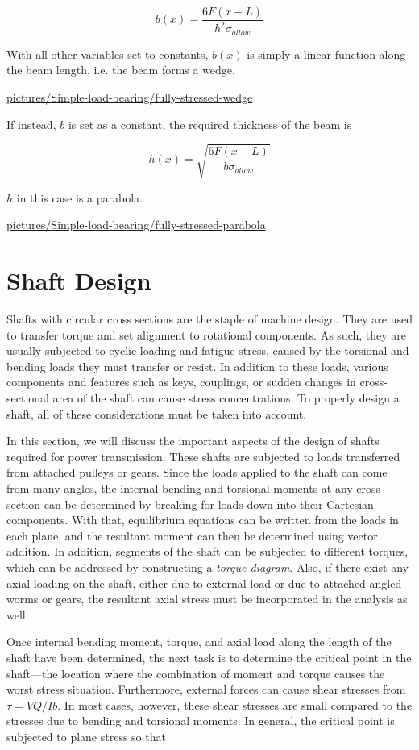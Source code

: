 \documentclass[a4paper,openany,12pt]{book}
\begin{document}
{{$$b(x) = \dfrac{6F(x-L)}{h^2 \sigma_{allow}}$$

With all other variables set to constants, \(b(x)\) is simply a linear
function along the beam length, i.e. the beam forms a wedge.


\url{pictures/Simple-load-bearing/fully-stressed-wedge}

If instead, \(b\) is set as a constant, the required thickness of the beam
is

$$h(x) = \sqrt{\dfrac{6F(x-L)}{b \sigma_{allow}}}$$

\(h\) in this case is a parabola.


\url{pictures/Simple-load-bearing/fully-stressed-parabola}

\section{Shaft Design}
\label{shaft-design}
Shafts with circular cross sections are the staple of machine design.
They are used to transfer torque and set alignment to rotational
components. As such, they are usually subjected to cyclic loading and
fatigue stress, caused by the torsional and bending loads they must
transfer or resist. In addition to these loads, various components and
features such as keys, couplings, or sudden changes in cross-sectional
area of the shaft can cause stress concentrations. To properly design a
shaft, all of these considerations must be taken into account.

In this section, we will discuss the important aspects of the design of
shafts required for power transmission. These shafts are subjected to
loads transferred from attached pulleys or gears. Since the loads
applied to the shaft can come from many angles, the internal bending and
torsional moments at any cross section can be determined by breaking for
loads down into their Cartesian components. With that, equilibrium
equations can be written from the loads in each plane, and the resultant
moment can then be determined using vector addition. In addition,
segments of the shaft can be subjected to different torques, which can
be addressed by constructing a \emph{torque diagram}. Also, if there exist
any axial loading on the shaft, either due to external load or due to
attached angled worms or gears, the resultant axial stress must be
incorporated in the analysis as well

Once internal bending moment, torque, and axial load along the length of
the shaft have been determined, the next task is to determine the
critical point in the shaft---the location where the combination of
moment and torque causes the worst stress situation. Furthermore,
external forces can cause shear stresses from \(\tau = VQ/Ib\). In most
cases, however, these shear stresses are small compared to the stresses
due to bending and torsional moments. In general, the critical point is
subjected to plane stress so that


}}
\end{document}
